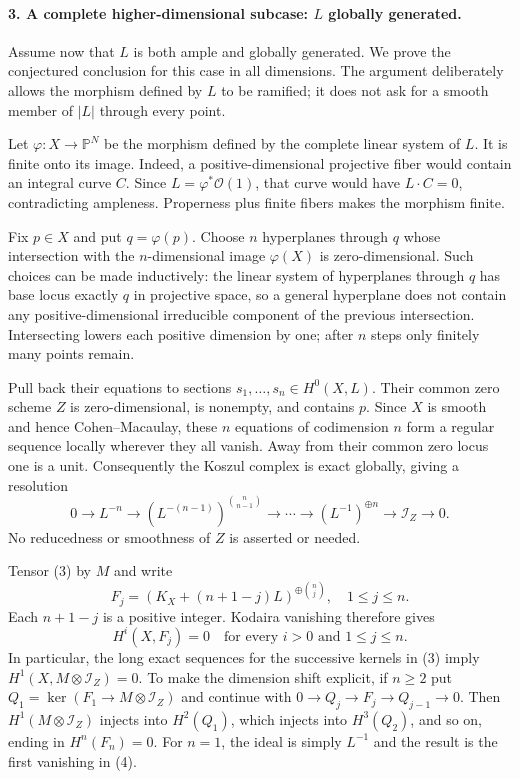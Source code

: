 \documentclass[11pt]{article}
\begin{document}
\paragraph{3. A complete higher-dimensional subcase: $L$ globally generated.}
Assume now that $L$ is both ample and globally generated. We prove the conjectured conclusion for this case in all dimensions. The argument deliberately allows the morphism defined by $L$ to be ramified; it does not ask for a smooth member of $|L|$ through every point.

Let $\varphi:X\to\mathbb P^N$ be the morphism defined by the complete linear system of $L$. It is finite onto its image. Indeed, a positive-dimensional projective fiber would contain an integral curve $C$. Since $L=\varphi^*\mathcal O(1)$, that curve would have $L\cdot C=0$, contradicting ampleness. Properness plus finite fibers makes the morphism finite.

Fix $p\in X$ and put $q=\varphi(p)$. Choose $n$ hyperplanes through $q$ whose intersection with the $n$-dimensional image $\varphi(X)$ is zero-dimensional. Such choices can be made inductively: the linear system of hyperplanes through $q$ has base locus exactly $q$ in projective space, so a general hyperplane does not contain any positive-dimensional irreducible component of the previous intersection. Intersecting lowers each positive dimension by one; after $n$ steps only finitely many points remain.

Pull back their equations to sections $s_1,\ldots,s_n\in H^0(X,L)$. Their common zero scheme $Z$ is zero-dimensional, is nonempty, and contains $p$. Since $X$ is smooth and hence Cohen--Macaulay, these $n$ equations of codimension $n$ form a regular sequence locally wherever they all vanish. Away from their common zero locus one is a unit. Consequently the Koszul complex is exact globally, giving a resolution
\[
 0\longrightarrow L^{-n}\longrightarrow
 (L^{-(n-1)})^{\binom n{n-1}}\longrightarrow\cdots
 \longrightarrow (L^{-1})^{\oplus n}
 \longrightarrow\mathcal I_Z\longrightarrow0.          \tag{3}
\]
No reducedness or smoothness of $Z$ is asserted or needed.

Tensor (3) by $M$ and write
\[
 F_j=(K_X+(n+1-j)L)^{\oplus\binom nj},\quad1\le j\le n.
\]
Each $n+1-j$ is a positive integer. Kodaira vanishing therefore gives
\[
 H^i(X,F_j)=0\quad\text{for every }i>0
                 \text{ and }1\le j\le n.              \tag{4}
\]
In particular, the long exact sequences for the successive kernels in (3) imply $H^1(X,M\otimes\mathcal I_Z)=0$. To make the dimension shift explicit, if $n\ge2$ put $Q_1=\ker(F_1\to M\otimes\mathcal I_Z)$ and continue with $0\to Q_j\to F_j\to Q_{j-1}\to0$. Then $H^1(M\otimes\mathcal I_Z)$ injects into $H^2(Q_1)$, which injects into $H^3(Q_2)$, and so on, ending in $H^n(F_n)=0$. For $n=1$, the ideal is simply $L^{-1}$ and the result is the first vanishing in (4).
\end{document}
